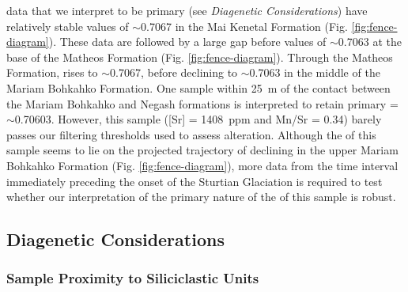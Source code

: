 \SrSr data that we interpret to be primary (see \textit{Diagenetic Considerations}) have relatively stable values of $\sim$0.7067 in the Mai Kenetal Formation (Fig. \ref{fig:fence-diagram}). These data are followed by a large gap before values of $\sim$0.7063 at the base of the Matheos Formation (Fig. \ref{fig:fence-diagram}). Through the Matheos Formation, \SrSr rises to $\sim$0.7067, before declining to $\sim$0.7063 in the middle of the Mariam Bohkahko Formation. One sample within 25~m of the contact between the Mariam Bohkahko and Negash formations is interpreted to retain primary \SrSr = $\sim$0.70603. However, this sample ([Sr] = 1408~ppm and Mn/Sr = 0.34) barely passes our filtering thresholds used to assess alteration. Although the \SrSr of this sample seems to lie on the projected trajectory of declining \SrSr in the upper Mariam Bohkahko Formation (Fig. \ref{fig:fence-diagram}), more data from the time interval immediately preceding the onset of the Sturtian Glaciation is required to test whether our interpretation of the primary nature of the \SrSr of this sample is robust.

\subsection{Diagenetic Considerations}

\subsubsection{Sample Proximity to Siliciclastic Units}

